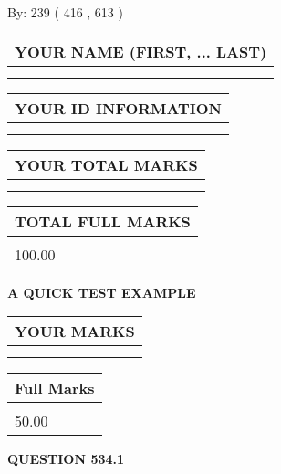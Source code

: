 \documentclass[12pt]{article}
\begin{document}
   
\hspace{1.0in} By: 
 239 ( 416 ,  613 )
   
   
   
   
\newpage 
\setcounter{page}{ 
   534001 } 
   
   
   
   
\noindent\begin{tabular}{|l|}
\hline
YOUR NAME (FIRST, ... LAST)  \\
\hline
 \\ 
 \\ 
\hline
\end{tabular}
\hspace{0.05in} \begin{tabular}{|l|}
\hline
 YOUR   ID   INFORMATION  \\
\hline
 \\ 
 \\ 
\hline
\end{tabular}
   
   
\vspace{0.2in}\noindent\begin{tabular}{|l|}
\hline
YOUR TOTAL MARKS  \\
\hline
 \\ 
 \\ 
\hline
\end{tabular}
\hspace{0.05in} \begin{tabular}{|l|}
\hline
TOTAL FULL MARKS  \\
\hline
 \\ 
100.00 \\
\hline
\end{tabular}
   
   
 \vspace{0.2in}
{\LARGE {\textbf{ A QUICK TEST EXAMPLE}}}
   
   
  
\vspace{0.2in}
  
\noindent\begin{tabular}{|l|}
\hline
 YOUR MARKS  \\
\hline
 \\ 
 \\ 
\hline
\end{tabular}
\hspace{0.05in} \begin{tabular}{|l|}
\hline
 Full Marks  \\
\hline
 \\ 
50.00 \\
\hline
\end{tabular}
{\textbf{\Large{QUESTION
534.1 
}}}
  
\end{document}
